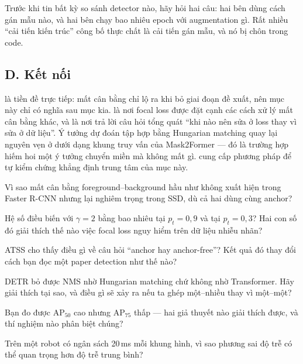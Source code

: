 \documentclass[../../../deep_learning.tex]{subfiles}
\begin{document}
\begin{cannho}
Trước khi tin bất kỳ so sánh detector nào, hãy hỏi hai câu: hai bên dùng cách gán mẫu nào, và hai bên chạy bao nhiêu epoch với augmentation gì. Rất nhiều ``cải tiến kiến trúc'' công bố thực chất là cải tiến gán mẫu, và nó bị chôn trong code. 
\end{cannho}

\subsection{D. Kết nối}
 là tiền đề trực tiếp: mất cân bằng chỉ lộ ra khi bỏ giai đoạn đề xuất, nên mục này chỉ có nghĩa sau mục kia.  là nơi focal loss được đặt cạnh các cách xử lý mất cân bằng khác, và là nơi trả lời câu hỏi tổng quát ``khi nào nên sửa ở loss thay vì sửa ở dữ liệu''. Ý tưởng dự đoán tập hợp bằng Hungarian matching quay lại nguyên vẹn ở  dưới dạng khung truy vấn của Mask2Former --- đó là trường hợp hiếm hoi một ý tưởng chuyển miền mà không mất gì.  cung cấp phương pháp để tự kiểm chứng khẳng định trung tâm của mục này.

\begin{tukiem}
\item Vì sao mất cân bằng foreground--background hầu như không xuất hiện trong Faster R-CNN nhưng lại nghiêm trọng trong SSD, dù cả hai dùng cùng anchor?
\item Hệ số điều biến với \(\gamma=2\) bằng bao nhiêu tại \(p_t = 0{,}9\) và tại \(p_t = 0{,}3\)? Hai con số đó giải thích thế nào việc focal loss nguy hiểm trên dữ liệu nhiễu nhãn?
\item ATSS cho thấy điều gì về câu hỏi ``anchor hay anchor-free''? Kết quả đó thay đổi cách bạn đọc một paper detection như thế nào?
\item DETR bỏ được NMS nhờ Hungarian matching chứ không nhờ Transformer. Hãy giải thích tại sao, và điều gì sẽ xảy ra nếu ta ghép một--nhiều thay vì một--một?
\item Bạn đo được \(\mathrm{AP}_{50}\) cao nhưng \(\mathrm{AP}_{75}\) thấp --- hai giả thuyết nào giải thích được, và thí nghiệm nào phân biệt chúng?
\item Trên một robot có ngân sách 20\,ms mỗi khung hình, vì sao phương sai độ trễ có thể quan trọng hơn độ trễ trung bình?
\end{tukiem}
\ifSubfilesClassLoaded{\printbibliography[title={Nguồn}]}{}
\end{document}
